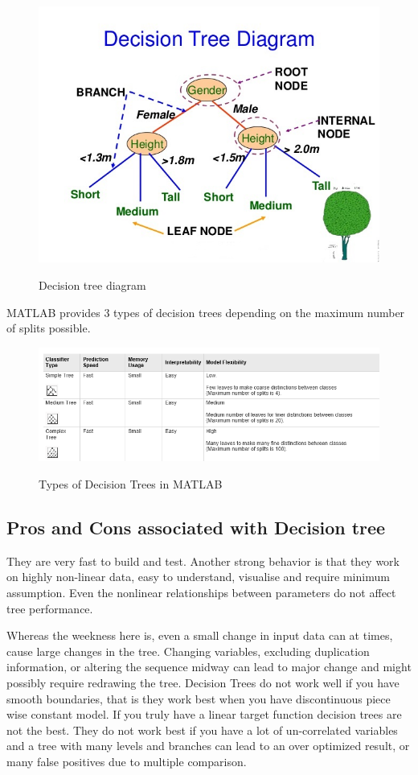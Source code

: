 \begin{figure}[H]
\centering
{\includegraphics[scale=0.48]{dt.jpg}}
\caption{Decision tree diagram}
\end{figure}

\noindent MATLAB provides 3 types of decision trees depending on the maximum number of splits possible.


\begin{figure}[H]
\centering
{\includegraphics[scale=0.8]{table.png}}
\caption{Types of Decision Trees in MATLAB}
\end{figure}

\newpage
\subsection{Pros and Cons associated with Decision tree} \label{Pros and Cons associated with Decision tree}

\noindent They are very fast to build and test. Another strong behavior is that they work on highly non-linear data, easy to understand, visualise and require minimum assumption. Even the nonlinear relationships between parameters do not affect tree performance.

\noindent Whereas the weekness here is, even a small change in input data can at times, cause large changes in the tree. Changing variables, excluding duplication information, or altering the sequence midway can lead to major change and might possibly require redrawing the tree. Decision Trees do not work well if you have smooth boundaries, that is they work best when you have discontinuous piece wise constant model. If you truly have a linear target function decision trees are not the best. They do not work best if you have a lot of un-correlated variables and a tree with many levels and branches can lead to an over optimized result, or many false positives due to multiple comparison.